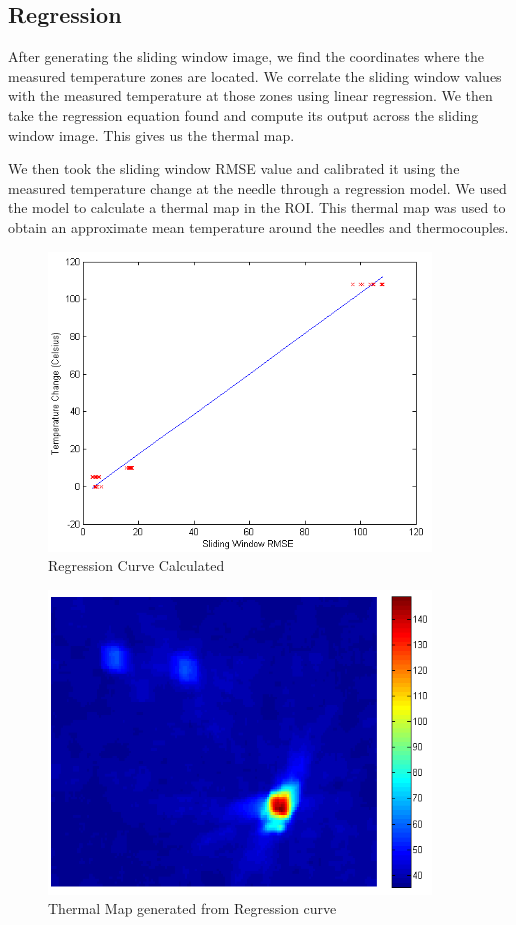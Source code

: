 \documentclass[]{spie}  %
\begin{document}
\subsection{Regression}

After generating the sliding window image, we find the coordinates where the measured temperature zones are located. We correlate the sliding window values with the measured temperature at those zones using linear regression. We then take the regression equation found and compute its output across the sliding window image. This gives us the thermal map.  

We then took the sliding window RMSE value and calibrated it using the measured temperature change at the needle through a regression model. We used the model to calculate a thermal map in the ROI. This thermal map was used to obtain an approximate mean temperature around the needles and thermocouples.

\begin{figure} 
\centering 
\includegraphics[width=4in]{slidingDiffRegression.png} 
\caption{Regression Curve Calculated} 
\end{figure}

\begin{figure} 
\centering 
\includegraphics[width=4in]{slidingDiffThermalMap.png} 
\caption{Thermal Map generated from Regression curve} 
\end{figure}
\end{document}
